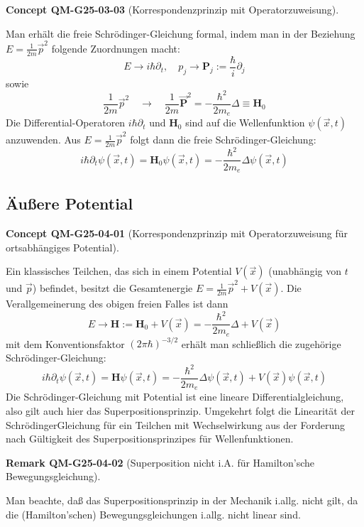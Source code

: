 \documentclass[10pt, letterpaper]{article}
\newcommand{\CustomHeading}[3]{%
  \par\medskip\noindent%
  \textbf{#1 #2} \textnormal{(#3)}.\enskip%
}
\newenvironment{REM}[2]{\CustomHeading{Remark}{#1}{#2}}{}
\newenvironment{CONC}[2]{\CustomHeading{Concept}{#1}{#2}}{}
\begin{document}
\begin{CONC}{QM-G25-03-03}{Korrespondenzprinzip mit Operatorzuweisung}
Man erhält die freie Schrödinger-Gleichung formal, indem man in der Beziehung $E=\frac{1}{2 m} \vec{p}^{2}$ folgende Zuordnungen macht:
$$
E \rightarrow i \hbar \partial_{t}, \quad p_{j} \rightarrow \mathbf{P}_{j}:=\frac{\hbar}{i} \partial_{j}
$$
sowie
$$
\frac{1}{2 m} \vec{p}^{2} \quad \rightarrow \quad \frac{1}{2 m} \overrightarrow{\mathbf{P}}^{2}=-\frac{\hbar^{2}}{2 m_{e}} \Delta \equiv \mathbf{H}_{0}
$$
Die Differential-Operatoren $i \hbar \partial_{t}$ und $\mathbf{H}_{0}$ sind auf die Wellenfunktion $\psi(\vec{x}, t)$ anzuwenden. Aus $E=\frac{1}{2 m} \vec{p}^{2}$ folgt dann die freie Schrödinger-Gleichung:
$$
i \hbar \partial_{t} \psi(\vec{x}, t)=\mathbf{H}_{0} \psi(\vec{x}, t)=-\frac{\hbar^{2}}{2 m_{e}} \Delta \psi(\vec{x}, t)
$$
\end{CONC}

\subsection{Äußere Potential}

\begin{CONC}{QM-G25-04-01}{Korrespondenzprinzip mit Operatorzuweisung für ortsabhängiges Potential}
Ein klassisches Teilchen, das sich in einem Potential $V(\vec{x})$ (unabhängig von $t$ und $\vec{p}$) befindet, besitzt die Gesamtenergie $E=\frac{1}{2 m} \vec{p}^{2}+V(\vec{x})$. Die Verallgemeinerung des obigen freien Falles ist dann
$$
E \rightarrow \mathbf{H}:=\mathbf{H}_{0}+V(\vec{x})=-\frac{\hbar^{2}}{2 m_{e}} \Delta+V(\vec{x})
$$
mit dem Konventionsfaktor $(2 \pi \hbar)^{-3/2}$ erhält man schließlich die zugehörige Schrödinger-Gleichung:
$$
i \hbar \partial_{t} \psi(\vec{x}, t)=\mathbf{H} \psi(\vec{x}, t)=-\frac{\hbar^{2}}{2 m_{e}} \Delta \psi(\vec{x}, t)+V(\vec{x}) \psi(\vec{x}, t)
$$
Die Schrödinger-Gleichung mit Potential ist eine lineare Differentialgleichung, also gilt auch hier das Superpositionsprinzip. Umgekehrt folgt die Linearität der SchrödingerGleichung für ein Teilchen mit Wechselwirkung aus der Forderung nach Gültigkeit des Superpositionsprinzipes für Wellenfunktionen.
\end{CONC}

\begin{REM}{QM-G25-04-02}{Superposition nicht i.A. für Hamilton'sche Bewegungsgleichung}
Man beachte, daß das Superpositionsprinzip in der Mechanik i.allg. nicht gilt, da die (Hamilton'schen) Bewegungsgleichungen i.allg. nicht linear sind.
\end{REM}
\end{document}
